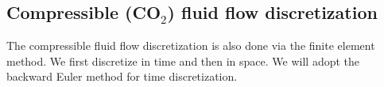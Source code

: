 % 
%


\subsection{Compressible (CO$_2$) fluid flow discretization}
\label{sec:CO2-discretization}
The compressible fluid flow discretization is also done via the finite element method. We first discretize in time and then in space. We will adopt the backward Euler method for time discretization.

